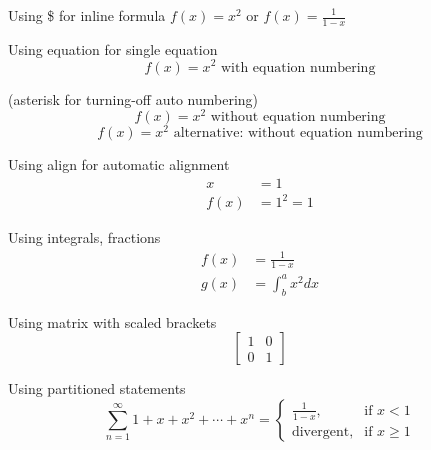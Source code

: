 \documentclass{article}
\begin{document}
Using \$ for inline formula $ f(x)=x^2 $ or \( f(x) = \frac{1}{1-x} \)

Using equation for single equation
\begin{equation}
  f(x) = x^2 \text{ with equation numbering}
\end{equation}

(asterisk for turning-off auto numbering)
\begin{equation*}
  f(x) = x^2 \mbox{ without equation numbering}
\end{equation*}
\begin{equation}
  f(x) = x^2 \mbox{ alternative: without equation numbering}\nonumber
\end{equation}

Using align for automatic alignment
\begin{align*}
  x &= 1\\
  f(x) &= 1^2 = 1
\end{align*}

Using integrals, fractions
\begin{align*}
  f(x) &= \frac{1}{1-x}\\
  g(x) &= \int^a_b x^2 dx
\end{align*}

Using matrix with scaled brackets
\begin{equation*}
\left[
\begin{matrix}
1 & 0\\
0 & 1
\end{matrix}
\right]
\end{equation*}

Using partitioned statements
\[
\sum_{n=1}^{\infty}1+x+x^2+\cdots+x^n =
  \begin{cases}
    \frac{1}{1-x}, & \text{if \(x<1\)}\\
    \text{divergent}, & \text{if \(x\geq1\)}
  \end{cases}
\]
\end{document}
